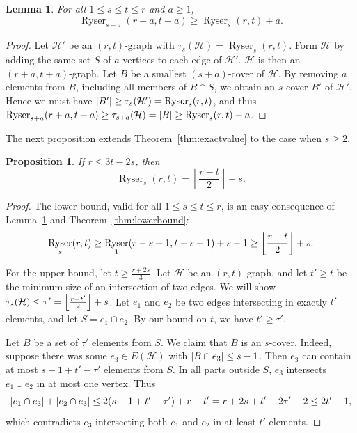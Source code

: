 \documentclass[a4paper,twoside,11pt]{article}
\DeclarePairedDelimiter{\floor}{\lfloor}{\rfloor}
\DeclarePairedDelimiter{\card}{|}{|}
\newtheorem{prop}[thm]{Proposition}
\newtheorem{lem}[thm]{Lemma}
\numberwithin{thm}{section}
\theoremstyle{definition}
\theoremstyle{remark}
\theoremstyle{definition}
\newcommand{\m}[1]{\mathcal{#1}}
\DeclareMathOperator{\Ryser}{Ryser}
\begin{document}
\begin{lem} \label{lem:scoverrecursive}
For all $1 \le s \le t \le r$ and $a \ge 1$,
\[ \Ryser_{s + a}(r + a, t + a) \ge \Ryser_{s}(r, t) + a. \]
\end{lem}
\begin{proof}
Let $\m H'$ be an $(r, t)$-graph with $\tau_{s}(\m H) = \Ryser_s(r,t)$.  
Form $\m H$ by adding the same set $S$ of $a$ vertices to each edge of $\m H'$.  
$\m H$ is then an $(r + a, t + a)$-graph. 
Let $B$ be a smallest $(s+a)$-cover of $\m H$.  By removing $a$ elements from $B$, including all members of $B \cap S$, we obtain an $s$-cover $B'$ of $\m H'$.  
Hence we must have $\card{B'} \ge \tau_{s}(\m H') = \Ryser_s(r,t)$, and thus $\Ryser_{s + a}(r + a, t + a) \ge \tau_{s+a}(\m H) = \card{B} \ge \Ryser_{s}(r, t) + a$.
\end{proof}

The next proposition extends Theorem~\ref{thm:exactvalue} to the case when $s \ge 2$.

\begin{prop} \label{prop:scover1}
If $r \le 3t - 2s$, then
\[ \Ryser_s(r,t) = \left\lfloor \frac{r-t}{2} \right\rfloor + s. \]
\end{prop}

\begin{proof}
The lower bound, valid for all $1 \le s \le t \le r$, is an easy consequence of Lemma~\ref{lem:scoverrecursive} and Theorem~\ref{thm:lowerbound}:
\[ \Ryser_{s}(r, t) \geq \Ryser_{1}(r - s + 1, t - s + 1) + s - 1 \ge \floor*{\frac{r-t}{2}} + s. \]

For the upper bound, let $t \ge \tfrac{r + 2s}{3}$.
Let $\m H$ be an $(r, t)$-graph, and let $t' \geq t$ be the minimum size of an intersection of two edges. 
 We will show $\tau_s(\m H) \le \tau' = \floor*{ \frac{r-t'}{2} } + s$.  Let $e_1$ and $e_2$ be two edges intersecting in exactly $t'$ elements, and let $S = e_1 \cap e_2$.  By our bound on $t$, we have $t' \ge \tau'$.

Let $B$ be a set of $\tau'$ elements from $S$.  We claim that $B$ is an $s$-cover.  Indeed, suppose there was some $e_3 \in E(\m H)$ with $\card{B \cap e_3} \le s-1$.  Then $e_3$ can contain at most $s-1 + t' - \tau'$ elements from $S$.  In all parts outside $S$, $e_3$ intersects $e_1 \cup e_2$ in at most one vertex.  Thus
\[ \card{e_1 \cap e_3} + \card{e_2 \cap e_3} \le 2(s-1 + t' - \tau') + r - t' = r + 2s + t' - 2\tau' - 2 \le 2t' - 1, \]
which contradicts $e_3$ intersecting both $e_1$ and $e_2$ in at least $t'$ elements.
\end{proof}
\end{document}
